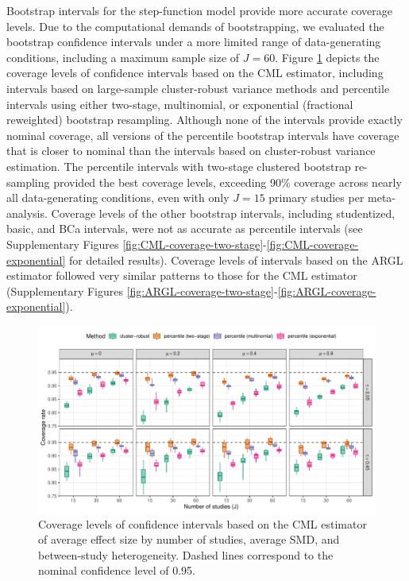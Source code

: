 \documentclass[
  man, donotrepeattitle,floatsintext]{apa7}
\begin{document}
Bootstrap intervals for the step-function model provide more accurate coverage levels.
Due to the computational demands of bootstrapping, we evaluated the bootstrap confidence intervals under a more limited range of data-generating conditions, including a maximum sample size of \(J = 60\).
Figure \ref{fig:CML-coverage} depicts the coverage levels of confidence intervals based on the CML estimator, including intervals based on large-sample cluster-robust variance methods and percentile intervals using either two-stage, multinomial, or exponential (fractional reweighted) bootstrap resampling.
Although none of the intervals provide exactly nominal coverage, all versions of the percentile bootstrap intervals have coverage that is closer to nominal than the intervals based on cluster-robust variance estimation.
The percentile intervals with two-stage clustered bootstrap re-sampling provided the best coverage levels, exceeding 90\% coverage across nearly all data-generating conditions, even with only \(J = 15\) primary studies per meta-analysis.
Coverage levels of the other bootstrap intervals, including studentized, basic, and BCa intervals, were not as accurate as percentile intervals (see Supplementary Figures \ref{fig:CML-coverage-two-stage}-\ref{fig:CML-coverage-exponential} for detailed results).
Coverage levels of intervals based on the ARGL estimator followed very similar patterns to those for the CML estimator (Supplementary Figures \ref{fig:ARGL-coverage-two-stage}-\ref{fig:ARGL-coverage-exponential}).

\begin{figure}
\includegraphics{step-function-selection-models-with-dependent-effects_files/figure-latex/CML-coverage-1} \caption{Coverage levels of confidence intervals based on the CML estimator of average effect size by number of studies, average SMD, and between-study heterogeneity. Dashed lines correspond to the nominal confidence level of 0.95.}\label{fig:CML-coverage}
\end{figure}
\end{document}
